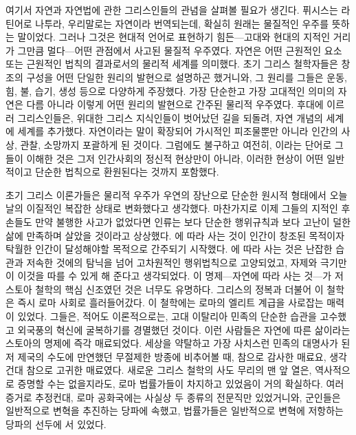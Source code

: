 여기서
자연과 자연법에 관한 그리스인들의 관념을 살펴볼 필요가 생긴다.
퓌시스는 라틴어로 나투라, 우리말로는
자연이라 번역되는데,
확실히 원래는 물질적인 우주를 뜻하는 말이었다.
그러나 그것은 현대적 언어로 표현하기 힘든---고대와 현대의 지적인 거리가
그만큼 멀다---어떤 관점에서 사고된
물질적 우주였다.
자연은 어떤 근원적인 요소 또는 근원적인 법칙의 결과로서의
물리적 세계를 의미했다.
초기 그리스 철학자들은
창조의 구성을 어떤 단일한 원리의 발현으로 설명하곤 했거니와,
그 원리를 그들은 운동, 힘, 불, 습기, 생성 등으로 다양하게 주장했다.
가장 단순한고 가장 고대적인 의미의 자연은 다름 아니라
이렇게 어떤 원리의 발현으로
간주된 물리적 우주였다.
후대에 이르러 그리스인들은, 위대한 그리스 지식인들이 벗어났던 길을 되돌려,
자연 개념의  세계에  세계를 추가했다.
자연이라는 말이 확장되어 가시적인 피조물뿐만 아니라 인간의 사상, 관찰, 소망까지
포괄하게 된 것이다.
그럼에도 불구하고 여전히, 이라는 단어로 그들이 이해한 것은
그저 인간사회의 정신적 현상만이 아니라,
이러한 현상이 어떤 일반적이고 단순한 법칙으로 환원된다는 것까지 포함했다.

초기 그리스 이론가들은 물리적 우주가 우연의 장난으로 단순한 원시적 형태에서
오늘날의 이질적인 복잡한 상태로 변화했다고 생각했다.
마찬가지로 이제 그들의 지적인 후손들도 만약 불행한 사고가 없었다면
인류는 보다 단순한 행위규칙과 보다 고난이 덜한 삶에 만족하며
살았을 것이라고 상상했다.
에 따라 사는 것이 인간이 창조된 목적이자
탁월한 인간이 달성해야할 목적으로 간주되기 시작했다.
에 따라 사는 것은 난잡한 습관과 저속한 것에의 탐닉을 넘어
고차원적인 행위법칙으로 고양되었고, 자제와 극기만이
이것을 따를 수 있게 해 준다고 생각되었다.
이 명제---자연에 따라 사는 것---가 저 스토아 철학의 핵심 신조였던 것은
너무도 유명하다.
그리스의 정복과 더불어 이 철학은 즉시 로마 사회로 흘러들어갔다.
이 철학에는 로마의 엘리트 계급을 사로잡는 매력이 있었다. 그들은, 적어도 이론적으로는,
고대 이탈리아 민족의 단순한 습관을 고수했고
외국풍의 혁신에 굴복하기를 경멸했던 것이다.
이런 사람들은 자연에 따른 삶이라는 스토아의 명제에 즉각 매료되었다.
세상을 약탈하고 가장 사치스런 민족의 대명사가 된 저 제국의 수도에 만연했던
무절제한 방종에 비추어볼 때, 참으로 감사한 매료요, 생각건대 참으로 고귀한 매료였다.
새로운 그리스 철학의 사도 무리의 맨 앞 열은,
역사적으로 증명할 수는 없을지라도, 로마 법률가들이 차지하고 있었음이 거의 확실하다.
여러 증거로 추정컨대,
로마 공화국에는 사실상 두 종류의 전문직만 있었거니와,
군인들은 일반적으로 변혁을 추진하는 당파에 속했고,
법률가들은 일반적으로 변혁에 저항하는 당파의 선두에 서 있었다.

